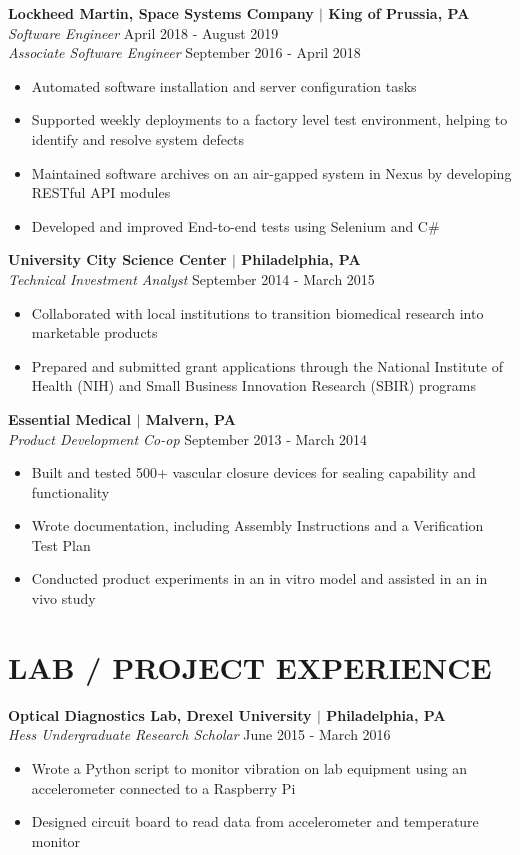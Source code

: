 \documentclass[line,resmargin,11pt]{res}
\begin{document}
\begin{resume}
\textbf{Lockheed Martin, Space Systems Company $|$ King of Prussia, PA} \\
{\sl Software Engineer} \hfill April 2018 - August 2019 \\
{\sl Associate Software Engineer} \hfill September 2016 - April 2018
	\begin{itemize}  \itemsep -2pt
		\item Automated software installation and server configuration tasks
		\item Supported weekly deployments to a factory level test environment, helping to identify and resolve system defects
		\item Maintained software archives on an air-gapped system in Nexus by developing RESTful API modules
		\item Developed and improved End-to-end tests using Selenium and C\#
	\end{itemize}
				
\textbf{University City Science Center $|$ Philadelphia, PA} \\
{\sl Technical Investment Analyst} \hfill September 2014 - March 2015 
	\begin{itemize} \itemsep -2pt
		\item Collaborated with local institutions to transition biomedical research into marketable products
		\item Prepared and submitted grant applications through the National Institute of Health (NIH) and Small Business Innovation Research (SBIR) programs
	\end{itemize}
				
\textbf{Essential Medical $|$ Malvern, PA} \\
{\sl Product Development Co-op} \hfill September 2013 - March 2014
	\begin{itemize} \itemsep -2pt
		\item  Built and tested 500+ vascular closure devices for sealing capability and functionality
		\item  Wrote documentation, including Assembly Instructions and a Verification Test Plan
		\item  Conducted product experiments in an in vitro model and assisted in an in vivo study
	\end{itemize}

\section{LAB / PROJECT EXPERIENCE}
\textbf{Optical Diagnostics Lab, Drexel University $|$ Philadelphia, PA} \\
{\sl Hess Undergraduate Research Scholar} \hfill June 2015 - March 2016
	\begin{itemize}  \itemsep -2pt
		\item  Wrote a Python script to monitor vibration on lab equipment using an accelerometer connected to a Raspberry Pi
		\item  Designed circuit board to read data from accelerometer and temperature monitor
	\end{itemize}


\end{resume}
\end{document}
